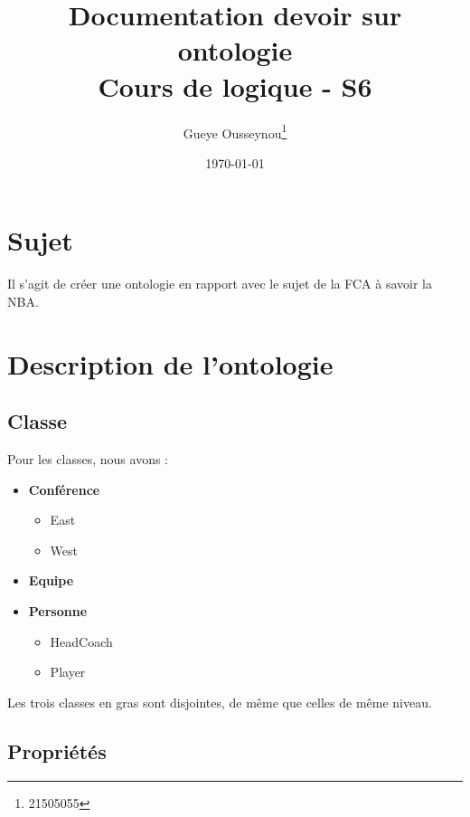 \documentclass[a4paper,11pt]{article}
\author{Gueye Ousseynou\thanks{21505055}}
\date{\today}
\title{\textbf{Documentation devoir sur ontologie} \\ Cours de logique - S6}
\begin{document}
\maketitle
\setcounter{tocdepth}{3}
\tableofcontents

\section{Sujet}
\label{sec-1}

Il s'agit de créer une ontologie en rapport avec le sujet de la FCA à savoir la NBA.

\section{Description de l'ontologie}
\label{sec-2}

\subsection{Classe}
Pour les classes, nous avons :
\begin{itemize}
    \item \textbf{Conférence}
        \begin{itemize}
            \item {East}
            \item {West}
        \end{itemize}
    \item \textbf{Equipe}
    \item \textbf{Personne}
        \begin{itemize}
            \item HeadCoach
            \item Player \\
        \end{itemize}
\end{itemize}

Les trois classes en gras sont disjointes, de même que celles de même niveau.

\subsection{Propriétés}
\end{document}
